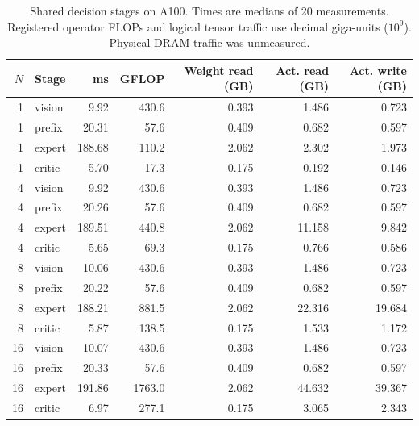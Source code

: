 \begin{table}[tb]
\centering\small
\caption{Shared decision stages on A100. Times are medians of 20 measurements. Registered operator FLOPs and logical tensor traffic use decimal giga-units ($10^9$). Physical DRAM traffic was unmeasured.}
\label{tab:profile}
\begin{tabular}{@{}rlrrrrr@{}}
\toprule
$N$ & Stage & ms & GFLOP & Weight read (GB) & Act. read (GB) & Act. write (GB) \\
\midrule
1 & vision & 9.92 & 430.6 & 0.393 & 1.486 & 0.723 \\
1 & prefix & 20.31 & 57.6 & 0.409 & 0.682 & 0.597 \\
1 & expert & 188.68 & 110.2 & 2.062 & 2.302 & 1.973 \\
1 & critic & 5.70 & 17.3 & 0.175 & 0.192 & 0.146 \\
4 & vision & 9.92 & 430.6 & 0.393 & 1.486 & 0.723 \\
4 & prefix & 20.26 & 57.6 & 0.409 & 0.682 & 0.597 \\
4 & expert & 189.51 & 440.8 & 2.062 & 11.158 & 9.842 \\
4 & critic & 5.65 & 69.3 & 0.175 & 0.766 & 0.586 \\
8 & vision & 10.06 & 430.6 & 0.393 & 1.486 & 0.723 \\
8 & prefix & 20.22 & 57.6 & 0.409 & 0.682 & 0.597 \\
8 & expert & 188.21 & 881.5 & 2.062 & 22.316 & 19.684 \\
8 & critic & 5.87 & 138.5 & 0.175 & 1.533 & 1.172 \\
16 & vision & 10.07 & 430.6 & 0.393 & 1.486 & 0.723 \\
16 & prefix & 20.33 & 57.6 & 0.409 & 0.682 & 0.597 \\
16 & expert & 191.86 & 1763.0 & 2.062 & 44.632 & 39.367 \\
16 & critic & 6.97 & 277.1 & 0.175 & 3.065 & 2.343 \\
\bottomrule
\end{tabular}
\end{table}
